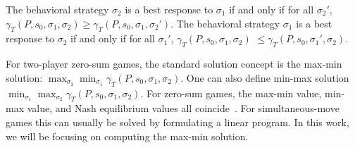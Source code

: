 \begin{definition}
The behavioral strategy $\sigma_2$ is a best response to $\sigma_1$ 
if and only if for all $\sigma_2'$, $\gamma_T(P,s_0,\sigma_1,\sigma_2) \ge \gamma_T(P,s_0,\sigma_1,\sigma_2')$. 
The behavioral strategy $\sigma_1$ is a best response to $\sigma_2$ 
if and only if for all $\sigma_1'$, $\gamma_T(P,s_0,\sigma_1,\sigma_2)$ $\le \gamma_T(P,s_0,\sigma_1',\sigma_2)$.
\end{definition}

For two-player zero-sum games, the standard solution concept is the max-min solution:
$\max_{\sigma_2} \min_{\sigma_1} \gamma_T(P,s_0,\sigma_1,\sigma_2) $.
One can also define min-max solution $ \min_{\sigma_1} \max_{\sigma_2} \gamma_T(P,s_0,\sigma_1,\sigma_2)$. 
For zero-sum games, the max-min value, min-max value, and 
Nash equilibrium values all coincide~\cite{fudenberg1991game}. 
For simultaneous-move games this can usually be solved by formulating a linear program. 
In this work, we will be focusing on computing the max-min solution. 





